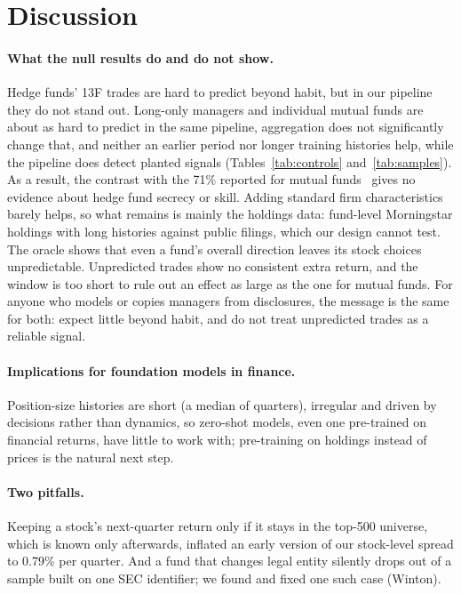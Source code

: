 \section{Discussion}

\paragraph{What the null results do and do not show.} Hedge funds' 13F trades
are hard to predict beyond habit, but in our pipeline they do not stand out. Long-only
managers and individual mutual funds are about as hard to predict in the same
pipeline, aggregation does not significantly change that, and neither an
earlier period nor longer training histories help, while the pipeline does
detect planted signals (Tables~\ref{tab:controls} and~\ref{tab:samples}). As a result,
the contrast with the 71\% reported for mutual funds~\cite{cohen2026mimicking}
gives no evidence about hedge fund secrecy or skill. Adding \firmn{} standard firm
characteristics barely helps, so what remains is mainly the holdings data:
fund-level Morningstar holdings with long histories against public filings,
which our design cannot test. The oracle shows that even a fund's overall direction leaves its
stock choices unpredictable. Unpredicted trades show no consistent extra
return, and the window is too short to rule out an effect as large as the one
for mutual funds. For anyone who models or copies managers from disclosures,
the message is the same for both: expect little beyond habit, and do not
treat unpredicted trades as a reliable signal.

\paragraph{Implications for foundation models in finance.} Position-size
histories are short (a median of \medhistM{} quarters), irregular and driven
by decisions rather than dynamics, so zero-shot models, even one pre-trained
on financial returns, have little to work with; pre-training on holdings
instead of prices is the natural next step.

\paragraph{Two pitfalls.} Keeping a stock's next-quarter return only if it
stays in the top-500 universe, which is known only afterwards, inflated an
early version of our stock-level spread to 0.79\% per quarter. And a fund that
changes legal entity silently drops out of a sample built on one SEC
identifier; we found and fixed one such case (Winton).

